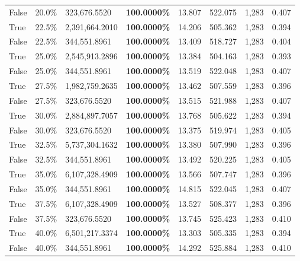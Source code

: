 \begin{table}[H]
\begin{tabular}{lllrllll}
\cline{1-8}
False & 20.0\% & 323,676.5520 & \bfseries \color{red} 100.0000\% & 13.807 & 522.075 & 1,283 & 0.407 \\
\cline{1-8}
True & 22.5\% & 2,391,664.2010 & \bfseries \color{red} 100.0000\% & 14.206 & 505.362 & 1,283 & 0.394 \\
\cline{1-8}
False & 22.5\% & 344,551.8961 & \bfseries \color{red} 100.0000\% & 13.409 & 518.727 & 1,283 & 0.404 \\
\cline{1-8}
True & 25.0\% & 2,545,913.2896 & \bfseries \color{red} 100.0000\% & 13.384 & 504.163 & 1,283 & 0.393 \\
\cline{1-8}
False & 25.0\% & 344,551.8961 & \bfseries \color{red} 100.0000\% & 13.519 & 522.048 & 1,283 & 0.407 \\
\cline{1-8}
True & 27.5\% & 1,982,759.2635 & \bfseries \color{red} 100.0000\% & 13.462 & 507.559 & 1,283 & 0.396 \\
\cline{1-8}
False & 27.5\% & 323,676.5520 & \bfseries \color{red} 100.0000\% & 13.515 & 521.988 & 1,283 & 0.407 \\
\cline{1-8}
True & 30.0\% & 2,884,897.7057 & \bfseries \color{red} 100.0000\% & 13.768 & 505.622 & 1,283 & 0.394 \\
\cline{1-8}
False & 30.0\% & 323,676.5520 & \bfseries \color{red} 100.0000\% & 13.375 & 519.974 & 1,283 & 0.405 \\
\cline{1-8}
True & 32.5\% & 5,737,304.1632 & \bfseries \color{red} 100.0000\% & 13.380 & 507.990 & 1,283 & 0.396 \\
\cline{1-8}
False & 32.5\% & 344,551.8961 & \bfseries \color{red} 100.0000\% & 13.492 & 520.225 & 1,283 & 0.405 \\
\cline{1-8}
True & 35.0\% & 6,107,328.4909 & \bfseries \color{red} 100.0000\% & 13.566 & 507.747 & 1,283 & 0.396 \\
\cline{1-8}
False & 35.0\% & 344,551.8961 & \bfseries \color{red} 100.0000\% & 14.815 & 522.045 & 1,283 & 0.407 \\
\cline{1-8}
True & 37.5\% & 6,107,328.4909 & \bfseries \color{red} 100.0000\% & 13.527 & 508.377 & 1,283 & 0.396 \\
\cline{1-8}
False & 37.5\% & 323,676.5520 & \bfseries \color{red} 100.0000\% & 13.745 & 525.423 & 1,283 & 0.410 \\
\cline{1-8}
True & 40.0\% & 6,501,217.3374 & \bfseries \color{red} 100.0000\% & 13.303 & 505.335 & 1,283 & 0.394 \\
\cline{1-8}
False & 40.0\% & 344,551.8961 & \bfseries \color{red} 100.0000\% & 14.292 & 525.884 & 1,283 & 0.410 \\

\end{tabular}
\end{table}
